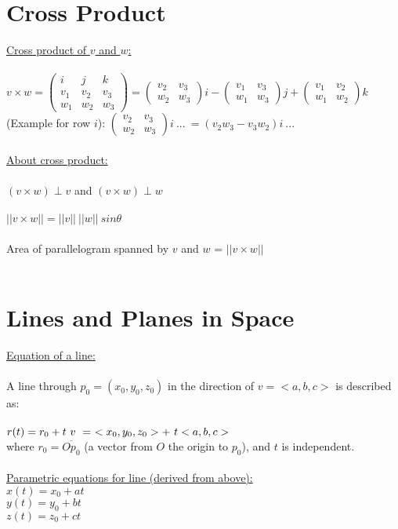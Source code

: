 \documentclass[12pt]{article}
\begin{document}
\section*{Cross Product}
\noindent
\underline{Cross product of $v$ and $w$:}\\\\
$
v \times w = \begin{pmatrix}  i&j&k\\v_1&v_2&v_3\\w_1&w_2&w_3\end{pmatrix}
=  \begin{pmatrix}  v_2&v_3\\w_2&w_3 \end{pmatrix}i
-\begin{pmatrix}  v_1&v_3\\w_1&w_3 \end{pmatrix}j
+\begin{pmatrix}  v_1&v_2\\w_1&w_2 \end{pmatrix}k
$\\
\indent
(Example for row $i$):
$\begin{pmatrix}  v_2&v_3\\w_2&w_3 \end{pmatrix}i  \ . . .  \ = (v_2w_3 - v_3w_2)i  \ . . .$\\\\


\noindent
\underline{About cross product:}\\\\
$(v \times w) \perp v$ and $(v \times w) \perp w$\\\\
$||v \times w|| = ||v|| \ ||w|| \ sin \theta$\\\\
Area of parallelogram spanned by $v$ and $w$ = $||v \times w||$\\\\

\section*{Lines and Planes in Space}
\noindent
\underline{Equation of a line:}\\\\
A line through $p_0 = (x_0,y_0,z_0)$ in the direction of $v = <a,b,c>$ is described as:\\\\
\indent$
r(t) = r_0 + t \ v \ =  \ <x_0,y_0,z_0> + \ t <a,b,c>\\
$\\
where $r_0 = \overline{Op_0}$ (a vector from $O$ the origin to $p_0$), and $t$ is independent.\\\\
\indent
\underline{Parametric equations for line (derived from above):}\\
\indent$x(t) = x_0 + at$\\
\indent $y(t) = y_0 + bt$ \\
\indent $z(t) = z_0 + ct$\\
\end{document}
